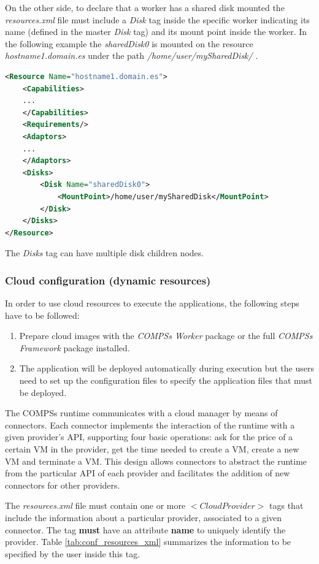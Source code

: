 On the other side, to declare that a worker has a shared disk mounted the \textit{resources.xml} file must include a \textit{Disk}
tag inside the specific worker indicating its name (defined in the master \textit{Disk} tag) and its mount point inside the worker.
In the following example the \textit{sharedDisk0} is mounted on the resource \textit{hostname1.domain.es} under the path
\textit{/home/user/mySharedDisk/} .
\begin{lstlisting}[language=xml]
<Resource Name="hostname1.domain.es">
    <Capabilities>
    ...
    </Capabilities>
    <Requirements/>
    <Adaptors>
    ...
    </Adaptors>
    <Disks>
        <Disk Name="sharedDisk0">
            <MountPoint>/home/user/mySharedDisk</MountPoint>
        </Disk>
    </Disks>
</Resource>
\end{lstlisting}

The \textit{Disks} tag can have multiple disk children nodes.


\subsubsection{Cloud configuration (dynamic resources)}
In order to use cloud resources to execute the applications, the following steps have to be followed:
\begin{enumerate}
 \item Prepare cloud images with the \textit{COMPSs Worker} package or the full \textit{COMPSs Framework} package installed.
 \item The application will be deployed automatically during execution but the users need to set up the configuration files to
 specify the application files that must be deployed. 
\end{enumerate}

The COMPSs runtime communicates with a cloud manager by means of connectors. Each connector implements 
the interaction of the runtime with a given provider's API, supporting four basic 
operations: ask for the price of a certain VM in the provider, get the time needed to create a VM, 
create a new VM and terminate a VM. This design allows connectors to abstract the runtime from the particular API
of each provider and facilitates the addition of new connectors for other providers.

The \textit{resources.xml} file must contain one or more \textbf{$<CloudProvider>$} tags
that include the information about a particular provider, associated to a given connector. The tag \textbf{must} have an
attribute \textbf{name} to uniquely identify the provider. Table \ref{tab:conf_resources_xml} summarizes the information to be 
specified by the user inside this tag.

